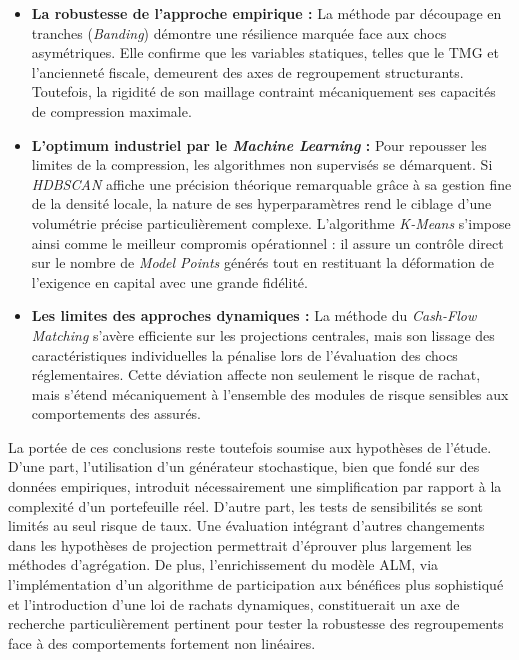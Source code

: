\begin{itemize}
    \item \textbf{La robustesse de l'approche empirique :} La méthode par découpage en tranches (\textit{Banding}) démontre une résilience marquée face aux chocs asymétriques. Elle confirme que les variables statiques, telles que le TMG et l'ancienneté fiscale, demeurent des axes de regroupement structurants. Toutefois, la rigidité de son maillage contraint mécaniquement ses capacités de compression maximale.
    \item \textbf{L'optimum industriel par le \textit{Machine Learning} :} Pour repousser les limites de la compression, les algorithmes non supervisés se démarquent. Si \textit{HDBSCAN} affiche une précision théorique remarquable grâce à sa gestion fine de la densité locale, la nature de ses hyperparamètres rend le ciblage d'une volumétrie précise particulièrement complexe. L'algorithme \textit{K-Means} s'impose ainsi comme le meilleur compromis opérationnel : il assure un contrôle direct sur le nombre de \textit{Model Points} générés tout en restituant la déformation de l'exigence en capital avec une grande fidélité.
    \item \textbf{Les limites des approches dynamiques :} La méthode du \textit{Cash-Flow Matching} s'avère efficiente sur les projections centrales, mais son lissage des caractéristiques individuelles la pénalise lors de l'évaluation des chocs réglementaires. Cette déviation affecte non seulement le risque de rachat, mais s'étend mécaniquement à l'ensemble des modules de risque sensibles aux comportements des assurés.
\end{itemize}

La portée de ces conclusions reste toutefois soumise aux hypothèses de l'étude. D'une part, l'utilisation d'un générateur stochastique, bien que fondé sur des données empiriques, introduit nécessairement une simplification par rapport à la complexité d'un portefeuille réel. D'autre part, les tests de sensibilités se sont limités au seul risque de taux. Une évaluation intégrant d'autres changements dans les hypothèses de projection permettrait d'éprouver plus largement les méthodes d'agrégation. De plus, l'enrichissement du modèle ALM, via l'implémentation d'un algorithme de participation aux bénéfices plus sophistiqué et l'introduction d'une loi de rachats dynamiques, constituerait un axe de recherche particulièrement pertinent pour tester la robustesse des regroupements face à des comportements fortement non linéaires.

